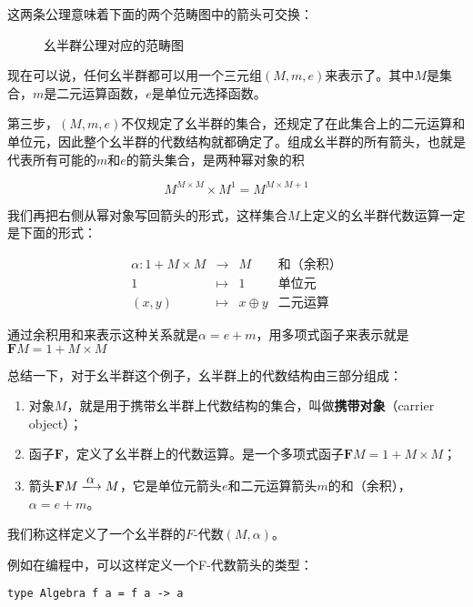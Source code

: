 \documentclass{article}
\begin{document}
\begin{example}
这两条公理意味着下面的两个范畴图中的箭头可交换：

\begin{figure}[htbp]
\centering
{}
\quad
{}
\caption{幺半群公理对应的范畴图}
\end{figure}

现在可以说，任何幺半群都可以用一个三元组$(M, m, e)$来表示了。其中$M$是集合，$m$是二元运算函数，$e$是单位元选择函数。

第三步，$(M, m, e)$不仅规定了幺半群的集合，还规定了在此集合上的二元运算和单位元，因此整个幺半群的代数结构就都确定了。组成幺半群的所有箭头，也就是代表所有可能的$m$和$e$的箭头集合，是两种幂对象的积

\[
M^{M \times M} \times M^1 = M^{M \times M + 1}
\]

我们再把右侧从幂对象写回箭头的形式，这样集合$M$上定义的幺半群代数运算一定是下面的形式：

\[
\begin{array}{rcll}
\alpha : 1 + M \times M & \longrightarrow & M & \text{和（余积）}\\
1 & \longmapsto & 1 & \text{单位元}  \\
(x, y) & \longmapsto & x \oplus y & \text{二元运算}
\end{array}
\]

通过余积用和来表示这种关系就是$\alpha = e + m$，用多项式函子来表示就是$\mathbf{F} M = 1 + M \times M$

总结一下，对于幺半群这个例子，幺半群上的代数结构由三部分组成：

\begin{enumerate}
  \item 对象$M$，就是用于携带幺半群上代数结构的集合，叫做\textbf{携带对象}（carrier object）；
  \item 函子$\mathbf{F}$，定义了幺半群上的代数运算。是一个多项式函子$\mathbf{F} M = 1 + M \times M$；
  \item 箭头$\mathbf{F} M \arrowto{\alpha} M$，它是单位元箭头$e$和二元运算箭头$m$的和（余积），$\alpha = e + m$。
\end{enumerate}

我们称这样定义了一个幺半群的$F$-代数$(M, \alpha)$。

例如在编程中，可以这样定义一个F-代数箭头的类型：

\begin{lstlisting}
type Algebra f a = f a -> a
\end{lstlisting}


\end{example}
\end{document}
